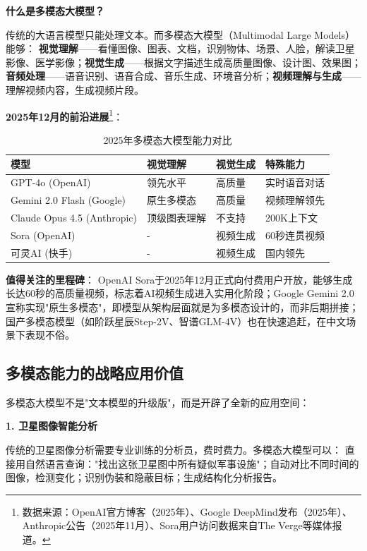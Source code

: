 \textbf{什么是多模态大模型？}

传统的大语言模型只能处理文本。而多模态大模型（Multimodal Large Models）能够：
\textbf{视觉理解}——看懂图像、图表、文档，识别物体、场景、人脸，解读卫星影像、医学影像；\textbf{视觉生成}——根据文字描述生成高质量图像、设计图、效果图；\textbf{音频处理}——语音识别、语音合成、音乐生成、环境音分析；\textbf{视频理解与生成}——理解视频内容，生成视频片段。

\textbf{2025年12月的前沿进展}\footnote{数据来源：OpenAI官方博客（2025年）、Google DeepMind发布（2025年）、Anthropic公告（2025年11月）、Sora用户访问数据来自The Verge等媒体报道。}：

\begin{table}[H]
\centering
\caption{2025年多模态大模型能力对比}
\small
\begin{tabular}{p{2.5cm}p{3cm}p{3cm}p{3.5cm}}
\toprule
\textbf{模型} & \textbf{视觉理解} & \textbf{视觉生成} & \textbf{特殊能力} \\
\midrule
GPT-4o (OpenAI) & 领先水平 & 高质量 & 实时语音对话 \\
Gemini 2.0 Flash (Google) & 原生多模态 & 高质量 & 视频理解领先 \\
Claude Opus 4.5 (Anthropic) & 顶级图表理解 & 不支持 & 200K上下文 \\
Sora (OpenAI) & - & 视频生成 & 60秒连贯视频 \\
可灵AI (快手) & - & 视频生成 & 国内领先 \\
\bottomrule
\end{tabular}
\end{table}

\textbf{值得关注的里程碑}：
OpenAI Sora于2025年12月正式向付费用户开放，能够生成长达60秒的高质量视频，标志着AI视频生成进入实用化阶段；Google Gemini 2.0宣称实现"原生多模态"，即模型从架构层面就是为多模态设计的，而非后期拼接；国产多模态模型（如阶跃星辰Step-2V、智谱GLM-4V）也在快速追赶，在中文场景下表现不俗。

\subsection{多模态能力的战略应用价值}

多模态大模型不是"文本模型的升级版"，而是开辟了全新的应用空间：

\textbf{1. 卫星图像智能分析}

传统的卫星图像分析需要专业训练的分析员，费时费力。多模态大模型可以：
直接用自然语言查询："找出这张卫星图中所有疑似军事设施"；自动对比不同时间的图像，检测变化；识别伪装和隐蔽目标；生成结构化分析报告。

